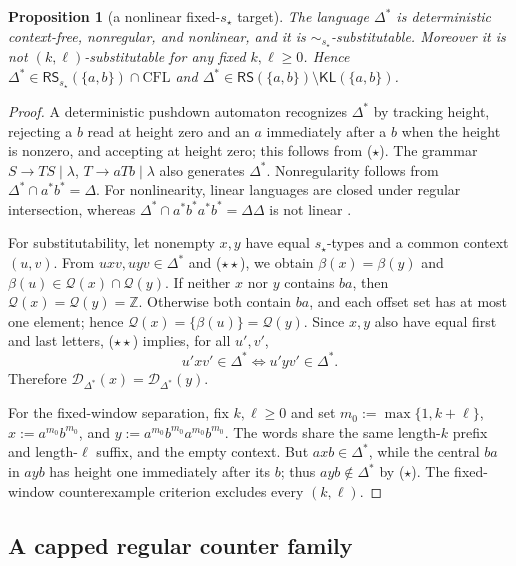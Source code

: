 \documentclass[11pt,a4paper]{article}
\newtheorem{proposition}[theorem]{Proposition}
\theoremstyle{remark}
\theoremstyle{plain}
\newcommand{\D}{\mathcal{D}}
\begin{document}
\begin{proposition}[a nonlinear fixed-$s_\star$ target]
\label{prop:nonlinear-rs-example}
The language $\Delta^*$ is deterministic context-free, nonregular, and
nonlinear, and it is $\sim_{s_\star}$-substitutable. Moreover it is not
$(k,\ell)$-substitutable for any fixed $k,\ell\ge0$. Hence
$\Delta^*\in\mathsf{RS}_{s_\star}(\{a,b\})\cap\mathrm{CFL}$ and
$\Delta^*\in\mathsf{RS}(\{a,b\})\setminus\mathsf{KL}(\{a,b\})$.
\end{proposition}

\begin{proof}
A deterministic pushdown automaton recognizes $\Delta^*$ by
tracking height, rejecting a $b$ read at height zero and
an $a$ immediately after a $b$ when the height is nonzero,
and accepting at height zero; this follows from
\textup{($\star$)}. The grammar
$S\to TS\mid\lambda$, $T\to aTb\mid\lambda$
also generates $\Delta^*$.
Nonregularity follows from
$\Delta^*\cap a^*b^*=\Delta$. For nonlinearity,
linear languages are closed under regular intersection,
whereas $\Delta^*\cap a^*b^*a^*b^*=\Delta\Delta$
is not linear
\cite[Section~6.1, before Theorem~6.1]{autebert1997}.

For substitutability, let nonempty $x,y$ have equal
$s_\star$-types and a common context $(u,v)$.
From $uxv,uyv\in\Delta^*$ and \textup{($\star\star$)},
we obtain $\beta(x)=\beta(y)$ and
$\beta(u)\in\mathcal Q(x)\cap\mathcal Q(y)$.
If neither $x$ nor $y$ contains $ba$, then
$\mathcal Q(x)=\mathcal Q(y)=\mathbb Z$.
Otherwise both contain $ba$, and each offset set
has at most one element; hence
$\mathcal Q(x)=\{\beta(u)\}=\mathcal Q(y)$.
Since $x,y$ also have equal first and last letters,
\textup{($\star\star$)} implies, for all $u',v'$,
\[
u'xv'\in\Delta^*\iff u'yv'\in\Delta^*.
\]
Therefore $\D_{\Delta^*}(x)=\D_{\Delta^*}(y)$.

For the fixed-window separation, fix $k,\ell\ge0$
and set $m_0:=\max\{1,k+\ell\}$,
$x:=a^{m_0}b^{m_0}$, and
$y:=a^{m_0}b^{m_0}a^{m_0}b^{m_0}$.
The words share the same length-$k$ prefix and
length-$\ell$ suffix, and the empty context.
But $axb\in\Delta^*$, while the central $ba$ in
$ayb$ has height one immediately after its $b$;
thus $ayb\notin\Delta^*$ by \textup{($\star$)}.
The fixed-window counterexample criterion excludes
every $(k,\ell)$.
\end{proof}

\subsection{A capped regular counter family}
\end{document}
